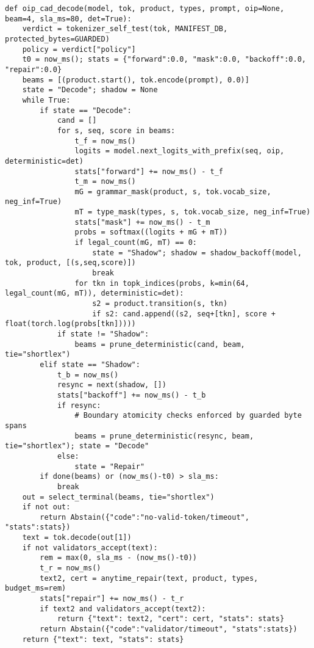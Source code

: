 \documentclass{article}
\begin{document}
\begin{lstlisting}[style=py, caption={OIP-CAD decoding with invariant checks and SLA accounting.}]
def oip_cad_decode(model, tok, product, types, prompt, oip=None, beam=4, sla_ms=80, det=True):
    verdict = tokenizer_self_test(tok, MANIFEST_DB, protected_bytes=GUARDED)
    policy = verdict["policy"]
    t0 = now_ms(); stats = {"forward":0.0, "mask":0.0, "backoff":0.0, "repair":0.0}
    beams = [(product.start(), tok.encode(prompt), 0.0)]
    state = "Decode"; shadow = None
    while True:
        if state == "Decode":
            cand = []
            for s, seq, score in beams:
                t_f = now_ms()
                logits = model.next_logits_with_prefix(seq, oip, deterministic=det)
                stats["forward"] += now_ms() - t_f
                t_m = now_ms()
                mG = grammar_mask(product, s, tok.vocab_size, neg_inf=True)
                mT = type_mask(types, s, tok.vocab_size, neg_inf=True)
                stats["mask"] += now_ms() - t_m
                probs = softmax((logits + mG + mT))
                if legal_count(mG, mT) == 0:
                    state = "Shadow"; shadow = shadow_backoff(model, tok, product, [(s,seq,score)])
                    break
                for tkn in topk_indices(probs, k=min(64, legal_count(mG, mT)), deterministic=det):
                    s2 = product.transition(s, tkn)
                    if s2: cand.append((s2, seq+[tkn], score + float(torch.log(probs[tkn]))))
            if state != "Shadow":
                beams = prune_deterministic(cand, beam, tie="shortlex")
        elif state == "Shadow":
            t_b = now_ms()
            resync = next(shadow, [])
            stats["backoff"] += now_ms() - t_b
            if resync:
                # Boundary atomicity checks enforced by guarded byte spans
                beams = prune_deterministic(resync, beam, tie="shortlex"); state = "Decode"
            else:
                state = "Repair"
        if done(beams) or (now_ms()-t0) > sla_ms:
            break
    out = select_terminal(beams, tie="shortlex")
    if not out:
        return Abstain({"code":"no-valid-token/timeout", "stats":stats})
    text = tok.decode(out[1])
    if not validators_accept(text):
        rem = max(0, sla_ms - (now_ms()-t0))
        t_r = now_ms()
        text2, cert = anytime_repair(text, product, types, budget_ms=rem)
        stats["repair"] += now_ms() - t_r
        if text2 and validators_accept(text2): 
            return {"text": text2, "cert": cert, "stats": stats}
        return Abstain({"code":"validator/timeout", "stats":stats})
    return {"text": text, "stats": stats}
\end{lstlisting}
\end{document}
